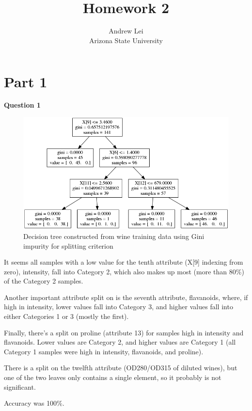 \documentclass{article}
\begin{document}
	\setlength{\droptitle}{-10em}
	\title{Homework 2}
	\author{Andrew Lei\\Arizona State University}
	\maketitle
	
	\section{Part 1}
	\noindent
	\textbf{Question 1}
	\begin{figure}[h]
		\includegraphics[scale=0.5]{gini_tree.png}
		\caption{Decision tree constructed from wine training data using Gini impurity for splitting criterion}
	\end{figure}
	\par
	It seems all samples with a low value for the tenth attribute (X[9] indexing from zero), intensity, fall into Category 2, which also makes up most (more than 80\%) of the Category 2 samples. 
	\par
	Another important attribute split on is the seventh attribute, flavanoids, where, if high in intensity, lower values fall into Category 3, and higher values fall into either Categories 1 or 3 (mostly the first).
	\par
	Finally, there's a split on proline (attribute 13) for samples high in intensity and flavanoids. Lower values are Category 2, and higher values are Category 1 (all Category 1 samples were high in intensity, flavanoids, and proline). 
	\par
	There is a split on the twelfth attribute (OD280/OD315 of diluted wines), but one of the two leaves only contains a single element, so it probably is not significant.
	\par 
	Accuracy was 100\%.
	
\end{document}
